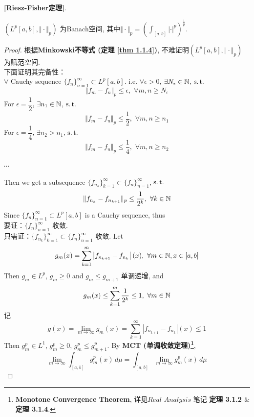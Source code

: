 	\begin{thm}\label{thm 2.1.1}
		\textbf{[Riesz-Fisher定理]}. 
		\begin{center}
			$(L^{p}[a , b] , \Vert \cdot \Vert_p)$ 为Banach空间, 其中$\Vert \cdot \Vert_p = \left( \int_{[a , b]} \left| \cdot \right|^p \right)^{\tfrac{1}{p}}$. 
		\end{center}
		
		\vspace{6em}
		
		\begin{proof}
			根据\textbf{Minkowski不等式 (定理 \ref{thm 1.1.4})}, 不难证明$(L^{p}[a,  b] , \Vert \cdot \Vert_{p})$ 为赋范空间. \\
			下面证明其完备性：\\
			$\forall$ Cauchy sequence $\{ f_n \}_{n = 1}^{\infty} \subset L^{p}[a , b]$. i.e. $\forall \epsilon > 0$, $\exists N_\epsilon \in \mathbb{N}$, $\operatorname{s.t.}$
			\[ \Vert f_m - f_n \Vert_{p} \leq \epsilon , \,\, \forall m , n \geq N_\epsilon \]
			For $\epsilon = \dfrac{1}{2}$, $\exists n_1 \in \mathbb{N}$, $\operatorname{s.t.}$
			\[ \Vert f_m - f_n \Vert_{p} \leq \frac{1}{2} , \,\, \forall m , n \geq n_1 \]
			For $\epsilon = \dfrac{1}{4}$, $\exists n_2 > n_1$, $\operatorname{s.t.}$
			\[ \Vert f_m - f_n \Vert_{p} \leq \frac{1}{4} , \,\, \forall m , n \geq n_2 \]
			\begin{center}
				$\cdots$
			\end{center}
			Then we get a subsequence $\{ f_{n_k} \}_{k = 1}^{\infty} \subset \{ f_n \}_{n = 1}^{\infty}$, $\operatorname{s.t.}$
			\[ \Vert f_{n_k} - f_{n_{k + 1}} \Vert_p \leq \frac{1}{2^k} , \,\, \forall k \in \mathbb{N} \]
			Since $\{ f_n \}_{n = 1}^{\infty} \subset L^{p}[a , b]$ is a Cauchy sequence, thus \\
			要证：$\{ f_n \}_{n = 1}^{\infty}$ 收敛. \\
			只需证：$\{ f_{n_k} \}_{k = 1}^{\infty} \subset \{ f_n \}_{n = 1}^{\infty}$ 收敛. Let
			\[ g_{m}(x) = \sum_{k = 1}^{m} \left| f_{n_{k + 1}} - f_{n_k} \right| (x) , \,\, \forall m \in \mathbb{N} , x \in [a , b] \]
			Then $g_m \in L^p$, $g_m \geq 0$ and $g_{m} \leq g_{m + 1}$ 单调递增, and
			\[ g_{m}(x) \leq \sum_{k = 1}^{m} \frac{1}{2^k} \leq 1 , \,\, \forall m \in \mathbb{N} \]
			记
			\[ g(x) = \lim_{m \to \infty} g_{m}(x) = \sum_{k = 1}^{\infty} \left| f_{n_{k + 1}} - f_{n_k} \right| (x) \leq 1 \]
			Then $g_{m}^p \in L^1$, $g_{m}^p \geq 0$, $g_{m}^p \leq g_{m + 1}^p$. By \textbf{MCT (单调收敛定理)\footnote{\textbf{Monotone Convergence Theorem}, 详见$Real \,\, Analysis$ 笔记 \textbf{定理 3.1.2 $\&$ 定理 3.1.4}.}}, 
			\[ \lim_{m \to \infty} \int_{[a , b]} g_{m}^p(x) \, d\mu = \int_{[a , b]} \lim_{m \to \infty} g_{m}^p(x) \, d\mu \]

\end{proof}
\end{thm}
